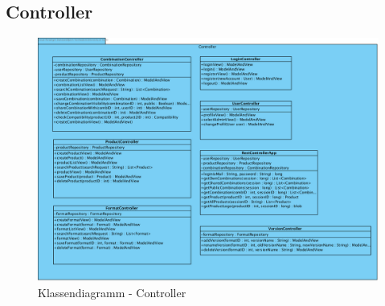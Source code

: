 \subsection{Controller}
\begin{figure}[h]
	\centering
	\includegraphics[width=\textwidth]{klassendiagramm/Controller}
	\caption{Klassendiagramm - Controller}
	\label{fig:klassendiagramm-controller}
\end{figure}

